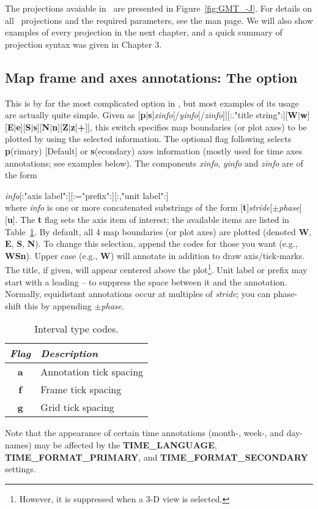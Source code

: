 The projections avaiable in \GMT\ are presented in Figure~\ref{fig:GMT_-J}.
For details on all \GMT\ projections and the required parameters, see the  man page.
We will also show examples of every projection in the next chapter, and a quick
summary of projection syntax was given in Chapter 3.

\subsection{Map frame and axes annotations: The  option}
\label{sec:timeaxis}
This is by far the most complicated option in \GMT, but most examples
of its usage are actually quite simple.
Given as [{\bf p}$|${\bf s}]{\it xinfo}[/{\it yinfo}[/{\it zinfo}]][:."title string":][{\bf W}$|${\bf w}][{\bf E}$|${\bf e}][{\bf S}$|${\bf s}][{\bf N}$|${\bf n}][{\bf Z}$|${\bf z}[{\bf +}]],
this switch specifies map boundaries (or plot axes) to be plotted by using the
selected information. The optional flag following  selects {\bf p}(rimary) [Default] or {\bf s}(econdary)
axes information (mostly used for time axes annotations; see examples below).
The components {\it xinfo}, {\it yinfo} and {\it zinfo} are of the form \\

\par {\it info}[:"axis label":][:="prefix":][:,"unit label":] \\

\noindent
where {\it info} is one or more concatenated substrings of the form
[{\bf t}]{\it stride}[$\pm${\it phase}][{\bf u}].  The {\bf t} flag sets the axis item of interest; the
available items are listed in Table~\ref{tbl:inttype}.  By
default, all 4 map boundaries (or plot axes) are plotted (denoted {\bf W}, {\bf E}, {\bf S},
{\bf N}).  To change this selection, append the codes for those you want
(e.g., {\bf WSn}).  Upper case (e.g., {\bf W}) will annotate in addition to
draw axis/tick-marks.  The title, if given, will appear centered above the plot\footnote{However,
it is suppressed when a 3-D view is selected.}.  Unit label or prefix may start with a
leading -- to suppress the space between it and the annotation.  Normally, equidistant annotations
occur at multiples of {\it stride}; you can phase-shift this by appending $\pm${\it phase}.
\begin{table}[H]
\centering
\begin{tabular}{|c|l|} \hline
\emph{Flag}	& \emph{Description} \\ \hline
{\bf a}	&	Annotation tick spacing \\ \hline
{\bf f}	&	Frame tick spacing \\ \hline
{\bf g}	&	Grid tick spacing \\ \hline
\end{tabular}
\caption{Interval type codes.}
\label{tbl:inttype}
\end{table}
\noindent
Note that the appearance of certain time annotations (month-, week-, and day-names) may be affected
by the {\bf TIME\_LANGUAGE}, {\bf TIME\_FORMAT\_PRIMARY}, and {\bf TIME\_FORMAT\_SECONDARY} settings.

